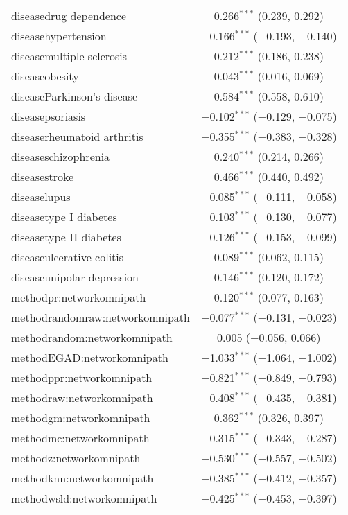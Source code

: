 \begin{table}[!htbp]
\begin{tabular}{@{\extracolsep{5pt}}lc}
  diseasedrug dependence & 0.266$^{***}$ (0.239, 0.292) \\ 
  diseasehypertension & $-$0.166$^{***}$ ($-$0.193, $-$0.140) \\ 
  diseasemultiple sclerosis & 0.212$^{***}$ (0.186, 0.238) \\ 
  diseaseobesity & 0.043$^{***}$ (0.016, 0.069) \\ 
  diseaseParkinson's disease & 0.584$^{***}$ (0.558, 0.610) \\ 
  diseasepsoriasis & $-$0.102$^{***}$ ($-$0.129, $-$0.075) \\ 
  diseaserheumatoid arthritis & $-$0.355$^{***}$ ($-$0.383, $-$0.328) \\ 
  diseaseschizophrenia & 0.240$^{***}$ (0.214, 0.266) \\ 
  diseasestroke & 0.466$^{***}$ (0.440, 0.492) \\ 
  diseaselupus & $-$0.085$^{***}$ ($-$0.111, $-$0.058) \\ 
  diseasetype I diabetes & $-$0.103$^{***}$ ($-$0.130, $-$0.077) \\ 
  diseasetype II diabetes & $-$0.126$^{***}$ ($-$0.153, $-$0.099) \\ 
  diseaseulcerative colitis & 0.089$^{***}$ (0.062, 0.115) \\ 
  diseaseunipolar depression & 0.146$^{***}$ (0.120, 0.172) \\ 
  methodpr:networkomnipath & 0.120$^{***}$ (0.077, 0.163) \\ 
  methodrandomraw:networkomnipath & $-$0.077$^{***}$ ($-$0.131, $-$0.023) \\ 
  methodrandom:networkomnipath & 0.005 ($-$0.056, 0.066) \\ 
  methodEGAD:networkomnipath & $-$1.033$^{***}$ ($-$1.064, $-$1.002) \\ 
  methodppr:networkomnipath & $-$0.821$^{***}$ ($-$0.849, $-$0.793) \\ 
  methodraw:networkomnipath & $-$0.408$^{***}$ ($-$0.435, $-$0.381) \\ 
  methodgm:networkomnipath & 0.362$^{***}$ (0.326, 0.397) \\ 
  methodmc:networkomnipath & $-$0.315$^{***}$ ($-$0.343, $-$0.287) \\ 
  methodz:networkomnipath & $-$0.530$^{***}$ ($-$0.557, $-$0.502) \\ 
  methodknn:networkomnipath & $-$0.385$^{***}$ ($-$0.412, $-$0.357) \\ 
  methodwsld:networkomnipath & $-$0.425$^{***}$ ($-$0.453, $-$0.397) \\ 

\end{tabular}
\end{table}
